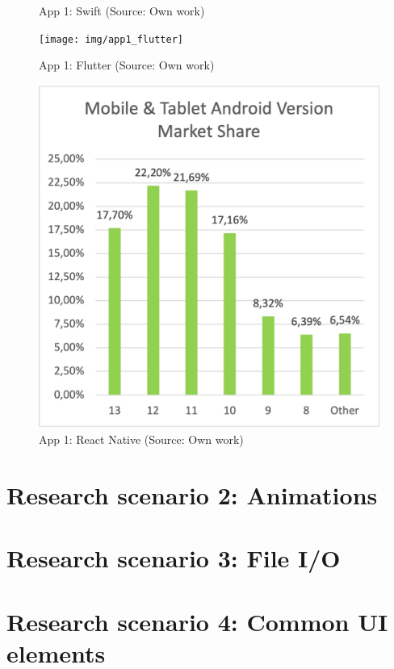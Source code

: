 \begin{figure}
\begin{minipage}{.47\textwidth}
      \caption{App 1: Swift (Source: Own work)}
      \label{fig:app1_swift}
    \end{minipage}
\end{figure}

\begin{figure}
    \begin{minipage}{.47\textwidth}
        \centering
        \texttt{[image: img/app1\_flutter]}
        \caption{App 1: Flutter (Source: Own work)}
        \label{fig:app1_flutter}
      \end{minipage}
      \hfill
      \begin{minipage}{.47\textwidth}
        \centering
        \includegraphics[width=.6\textwidth]{img/android_ver_market_share}
        \caption{App 1: React Native (Source: Own work)}
        \label{fig:app1_react_native}
      \end{minipage}
\end{figure}

\section{Research scenario 2: Animations}

\section{Research scenario 3: File I/O}

\section{Research scenario 4: Common UI elements}
